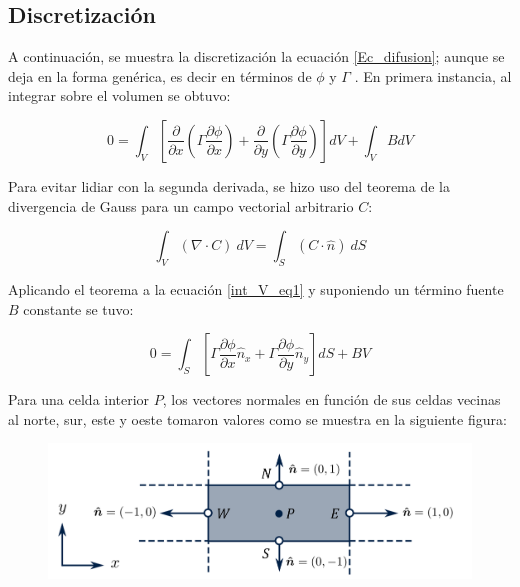 \documentclass[article,latterpaper]{IEEEtran}
\begin{document}
\subsection{Discretización}

A continuación, se muestra la discretización la ecuación \eqref{Ec_difusion}; aunque se deja en la forma genérica, es decir en términos de $\phi$ y $\Gamma$ . En primera instancia, al integrar sobre el volumen se obtuvo:

\begin{equation}
    0 = \int_V \left[ \frac{\partial}{\partial x} \left( \Gamma \frac{\partial \phi}{\partial x}  \right) +  \frac{\partial}{\partial y} \left( \Gamma \frac{\partial \phi}{\partial y}  \right) \right] dV + \int_V B dV
    \label{int_V_eq1}
\end{equation}

Para evitar lidiar con la segunda derivada, se hizo uso del teorema de la divergencia de Gauss para un campo vectorial arbitrario $C$:

\begin{equation}
    \int_V (\nabla \cdot C) \: dV = \int_S (C \cdot \hat{n}) \: dS
\end{equation}

Aplicando el teorema a la ecuación \eqref{int_V_eq1} y suponiendo un término fuente $B$ constante se tuvo:

\begin{equation}
    0 = \int_S \left[ \Gamma \frac{\partial \phi}{\partial x} \hat{n}_x + \Gamma \frac{\partial \phi}{\partial y} \hat{n}_y  \right] dS + B V 
    \label{int_S_eq1}
\end{equation}

Para una celda interior $P$, los vectores normales en función de sus celdas vecinas al norte, sur, este y oeste tomaron valores como se muestra en la siguiente figura:

\begin{figure}[H]
    \centering
    \includegraphics[scale=0.3]{normales_celda.png}
    \caption{ }
    \label{norm_P}
\end{figure}
\end{document}
